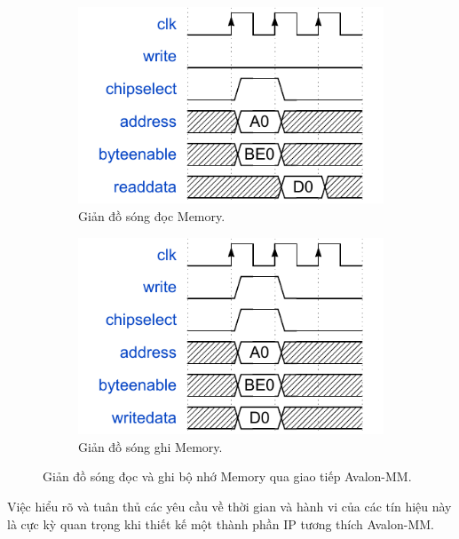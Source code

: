 \begin{figure}[htbp]
    \centering
    \begin{subfigure}[b]{0.48\textwidth}
        \centering
        \includegraphics[width=\linewidth]{Images/02_07_Memory_ReadWaveform.pdf}
        \caption{Giản đồ sóng đọc Memory.}
        \label{fig:02_07_memory_read_sub}
    \end{subfigure}
    \hfill
    \begin{subfigure}[b]{0.48\textwidth}
        \centering
        \includegraphics[width=\linewidth]{Images/02_08_Memory_WriteWaveform.pdf}
        \caption{Giản đồ sóng ghi Memory.}
        \label{fig:02_08_memory_write_sub}
    \end{subfigure}
    \caption{Giản đồ sóng đọc và ghi bộ nhớ Memory qua giao tiếp Avalon-MM.}
    \label{fig:memory_waveforms}
\end{figure}

Việc hiểu rõ và tuân thủ các yêu cầu về thời gian và hành vi của các tín hiệu này là cực kỳ quan trọng khi thiết kế một thành phần IP tương thích Avalon-MM.

